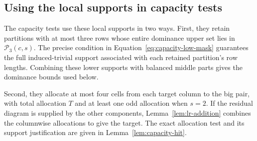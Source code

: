 \subsection{Using the local supports in capacity tests}

The capacity tests use these local supports in two ways. First,
they retain partitions with at most three rows whose entire dominance upper
set lies in $\mathcal P_3(c,s)$.  The precise condition in
Equation~\eqref{eq:capacity-low-mask} guarantees the full
induced-trivial support associated with each retained partition's
row lengths.  Combining these lower supports with balanced middle
parts gives the dominance bounds used below.

Second, they allocate at most four cells from each target column
to the big pair, with total allocation $T$ and at least one odd
allocation when $s=2$.  If the residual diagram is supplied by
the other components, Lemma~\ref{lem:lr-addition} combines the
columnwise allocations to give the target.  The exact allocation
test and its support justification are given in
Lemma~\ref{lem:capacity-hit}.
